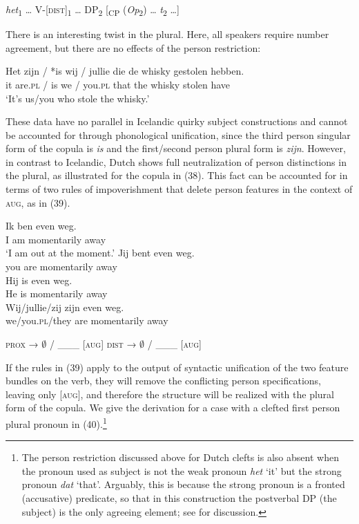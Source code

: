 \documentclass[output=paper]{langsci/langscibook}
\begin{document}
\ea 
 \textit{het}\textsubscript{1} … V-[\textsc{dist}]\textsubscript{1} … DP\textsubscript{2} [\textsubscript{CP} (\textit{Op}\textsubscript{2}) … \textit{t}\textsubscript{2} …]
\z

There is an interesting twist in the plural. Here, all speakers require number agreement, but there are no effects of the person restriction:

\ea 
 \gll  Het zijn / *is   wij / jullie  die  de  whisky gestolen hebben.\\
      it    are.\textsc{pl} / is we / you.\textsc{pl} that the whisky stolen     have\\
 \glt    ‘It’s us/you who stole the whisky.’
\z



These data have no parallel in Icelandic quirky subject constructions and cannot be accounted for through phonological unification, since the third person singular form of the copula is \textit{is} and the first\slash second person plural form is \textit{zijn}. However, in contrast to Icelandic, Dutch shows full neutralization of person distinctions in the plural, as illustrated for the copula in (38). This fact can be accounted for in terms of two rules of impoverishment that delete person features in the context of \textsc{aug}, as in (39).

\ea \label{bkm:Ref295574585}  
\ea \gll Ik ben even              weg.\\
    I   am  momentarily away\\
\glt ‘I am out at the moment.’
\ex \gll Jij   bent even              weg.\\
    you are   momentarily away\\
\ex \gll  Hij is even             weg.\\
He is momentarily away\\
\ex \gll  Wij/jullie/zij     zijn even              weg.\\
    we/you.\textsc{pl}/they are   momentarily away\\
\z \z

\ea \label{bkm:Ref328734023}\label{bkm:Ref295642138}  
\ea \textsc{prox} → $\emptyset$ / \_\_\_ [\textsc{aug}]
\ex \textsc{dist} → $\emptyset$ / \_\_\_ [\textsc{aug}]
\z
\z

If the rules in (39) apply to the output of syntactic unification of the two feature bundles on the verb, they will remove the conflicting person specifications, leaving only [\textsc{aug}], and therefore the structure will be realized with the plural form of the copula. We give the derivation for a case with a clefted first person plural pronoun in (40).\footnote{The person restriction discussed above for Dutch clefts is also absent when the pronoun used as subject is not the weak pronoun \textit{het} ‘it’ but the strong pronoun \textit{dat} ‘that’. Arguably, this is because the strong pronoun is a fronted (accusative) predicate, so that in this construction the postverbal DP (the subject) is the only agreeing element; see \citet{Ackema2018} for discussion.}
\end{document}
